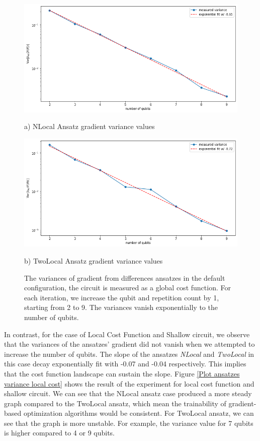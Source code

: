 \begin{figure}
    \includegraphics[width=\textwidth]{Artefact/Appendices/NLocalDefault.png}
    \centerline{a) NLocal Ansatz gradient variance values}
    \includegraphics[width=\textwidth]{Artefact/Appendices/TwoLocalDefault.png}
    \centerline{b) TwoLocal Ansatz gradient variance values}
    \caption{
        The variances of gradient from differences ansatzes in the default configuration, the circuit is measured as a global cost function.
        For each iteration, we increase the qubit and repetition count by 1, starting from 2 to 9.
        The variances vanish exponentially to the number of qubits.
    }
    \label{Plot ansatzes variance default}
\end{figure}

In contrast, for the case of Local Cost Function and Shallow circuit, we observe that the variances of the ansatzes' gradient did not vanish when we attempted to increase the number of qubits.
The slope of the ansatzes \emph{NLocal} and \emph{TwoLocal} in this case decay exponentially fit with -0.07 and -0.04 respectively.
This implies that the cost function landscape can sustain the slope.
Figure \ref{Plot ansatzes variance local cost} shows the result of the experiment for local cost function and shallow circuit.
We can see that the NLocal ansatz case produced a more steady graph compared to the TwoLocal ansatz, which mean the trainability of gradient-based optimization algorithms would be consistent.
For TwoLocal ansatz, we can see that the graph is more unstable. 
For example, the variance value for 7 qubits is higher compared to 4 or 9 qubits.

